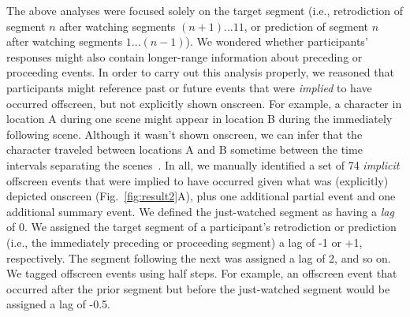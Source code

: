 \documentclass[10pt]{article}
\begin{document}
The above analyses were focused solely on the target segment (i.e., retrodiction of segment $n$ after watching segments $(n+1)... 11$, or prediction of segment $n$ after watching segments $1 ...(n-1)$).  We wondered whether participants' responses might also contain longer-range information about preceding or proceeding events.  In order to carry out this analysis properly, we reasoned that participants might reference past or future events that were \textit{implied} to have occurred offscreen, but not explicitly shown onscreen.  For example, a character in location A during one scene might appear in location B during the immediately following scene.  Although it wasn't shown onscreen, we can infer that the character traveled between locations A and B sometime between the time intervals separating the scenes~\citep{Bord08}.  In all, we manually identified a set of 74 \textit{implicit} offscreen events that were implied to have occurred given what was (explicitly) depicted onscreen (Fig.~\ref{fig:result2}A), plus one additional partial event and one additional summary event.  We defined the just-watched segment as having a \textit{lag} of 0.  We assigned the target segment of a participant's retrodiction or prediction (i.e., the immediately preceding or proceeding segment) a lag of -1 or +1, respectively.  The segment following the next was assigned a lag of 2, and so on.  We tagged offscreen events using half steps.  For example, an offscreen event that occurred after the prior segment but before the just-watched segment would be assigned a lag of -0.5.
\end{document}
